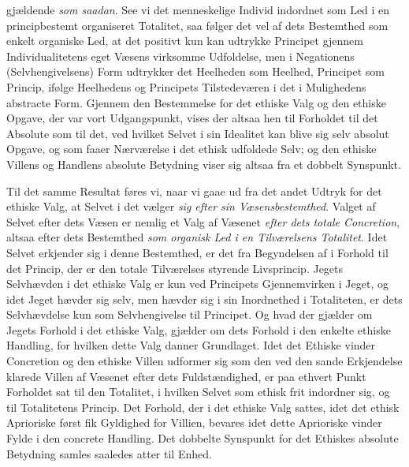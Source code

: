 gjældende \emph{som saadan}. See vi det menneskelige Individ indordnet som Led i
en principbestemt organiseret Totalitet, saa følger det vel af dets Bestemthed som
enkelt organiske Led, at det positivt kun kan udtrykke Principet gjennem
Individualitetens eget Væsens virksomme Udfoldelse, men i Negationens
(Selvhengivelsens) Form udtrykker det Heelheden som Heelhed, Principet som
Princip, ifølge Heelhedens og Principets Tilstedeværen i det i Mulighedens
abstracte Form. Gjennem den Bestemmelse for det ethiske Valg og den ethiske
Opgave, der var vort Udgangspunkt, vises der altsaa hen til Forholdet til det
Absolute som til det, ved hvilket Selvet i sin Idealitet kan blive sig selv
absolut Opgave, og som faaer Nærværelse i det ethisk udfoldede Selv; og den
ethiske Villens og Handlens absolute Betydning viser sig altsaa fra et dobbelt
Synspunkt.

Til det samme Resultat føres vi, naar vi gaae ud fra det andet Udtryk for det
ethiske Valg, at Selvet i det vælger \emph{sig efter sin Væsensbestemthed}. Valget
af Selvet efter dets Væsen er nemlig et Valg af Væsenet \emph{efter dets totale
Concretion}, altsaa efter dets Bestemthed \emph{som organisk Led i en Tilværelsens
Totalitet}. Idet Selvet erkjender sig i denne Bestemthed, er det fra Begyndelsen
af i Forhold til det Princip, der er den totale Tilværelses styrende Livsprincip.
Jegets Selvhævden i det ethiske Valg er kun ved Principets Gjennemvirken i Jeget,
 og idet Jeget hævder sig selv, men hævder sig i sin Inordnethed i Totaliteten, er
dets Selvhævdelse kun som Selvhengivelse til Principet. Og hvad der gjælder om
Jegets Forhold i det ethiske Valg, gjælder om dets Forhold i den enkelte ethiske
Handling, for hvilken dette Valg danner Grundlaget. Idet det Ethiske vinder
Concretion og den ethiske Villen udformer sig som den ved den sande Erkjendelse
klarede Villen af Væsenet efter dets Fuldstændighed, er paa ethvert Punkt
Forholdet sat til den Totalitet, i hvilken Selvet som ethisk frit indordner sig,
og til Totalitetens Princip. Det Forhold, der i det ethiske Valg sattes, idet det
ethisk Aprioriske først fik Gyldighed for Villien, bevares idet dette Aprioriske
vinder Fylde i den concrete Handling. Det dobbelte Synspunkt for det Ethiskes
absolute Betydning samles saaledes atter til Enhed.

